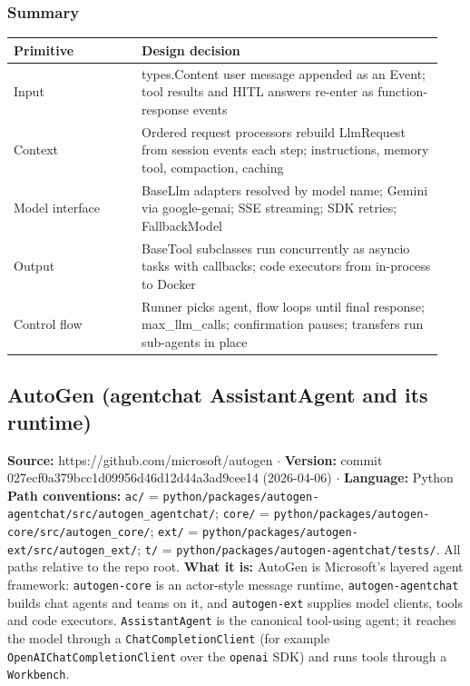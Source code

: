 \subsubsection*{Summary}
\begin{longtable}{@{}p{0.28\linewidth}p{0.66\linewidth}@{}}
\toprule \textbf{Primitive} & \textbf{Design decision} \\ \midrule \endhead
Input & types.Content user message appended as an Event; tool results and HITL answers re-enter as function-response events \\
Context & Ordered request processors rebuild LlmRequest from session events each step; instructions, memory tool, compaction, caching \\
Model interface & BaseLlm adapters resolved by model name; Gemini via google-genai; SSE streaming; SDK retries; FallbackModel \\
Output & BaseTool subclasses run concurrently as asyncio tasks with callbacks; code executors from in-process to Docker \\
Control flow & Runner picks agent, flow loops until final response; max\_llm\_calls; confirmation pauses; transfers run sub-agents in place \\
\bottomrule \end{longtable}


\subsection{AutoGen (agentchat AssistantAgent and its runtime)}

\textbf{Source:} https://github.com/microsoft/autogen $\cdot$ \textbf{Version:} commit 027ecf0a379bcc1d09956d46d12d44a3ad9cee14 (2026-04-06) $\cdot$ \textbf{Language:} Python
\textbf{Path conventions:} \texttt{ac/\allowbreak{}} = \texttt{python/\allowbreak{}packages/\allowbreak{}autogen-\allowbreak{}agentchat/\allowbreak{}src/\allowbreak{}autogen\_\allowbreak{}agentchat/\allowbreak{}}; \texttt{core/\allowbreak{}} = \texttt{python/\allowbreak{}packages/\allowbreak{}autogen-\allowbreak{}core/\allowbreak{}src/\allowbreak{}autogen\_\allowbreak{}core/\allowbreak{}}; \texttt{ext/\allowbreak{}} = \texttt{python/\allowbreak{}packages/\allowbreak{}autogen-\allowbreak{}ext/\allowbreak{}src/\allowbreak{}autogen\_\allowbreak{}ext/\allowbreak{}}; \texttt{t/\allowbreak{}} = \texttt{python/\allowbreak{}packages/\allowbreak{}autogen-\allowbreak{}agentchat/\allowbreak{}tests/\allowbreak{}}. All paths relative to the repo root.
\textbf{What it is:} AutoGen is Microsoft's layered agent framework: \texttt{autogen-\allowbreak{}core} is an actor-style message runtime, \texttt{autogen-\allowbreak{}agentchat} builds chat agents and teams on it, and \texttt{autogen-\allowbreak{}ext} supplies model clients, tools and code executors. \texttt{AssistantAgent} is the canonical tool-using agent; it reaches the model through a \texttt{ChatCompletionClient} (for example \texttt{OpenAIChatCompletionClient} over the \texttt{openai} SDK) and runs tools through a \texttt{Workbench}.

